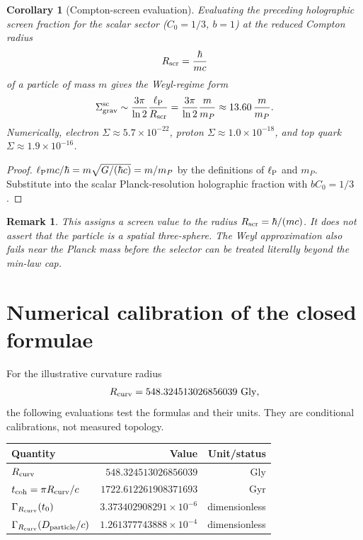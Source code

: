 \documentclass[11pt,a4paper]{article}
\newtheorem{corollary}[theorem]{Corollary}
\newtheorem{remark}[theorem]{Remark}
\newcommand{\ellP}{\ell_{\rm P}}
\begin{document}
\begin{corollary}[Compton-screen evaluation]
\label{cor:compton-screen}
Evaluating the preceding holographic screen fraction for the scalar sector ($C_0=1/3$, $b=1$) at the reduced Compton radius
\[
R_{\rm scr}=\frac{\hbar}{mc}
\]
of a particle of mass $m$ gives the Weyl-regime form
\[
\Sigma_{\rm grav}^{\rm sc}
\sim
\frac{3\pi}{\ln2}\frac{\ellP}{R_{\rm scr}}
=
\frac{3\pi}{\ln2}\frac{m}{m_P}
\approx 13.60\,\frac{m}{m_P}.
\]
Numerically, electron $\Sigma\approx5.7\times10^{-22}$, proton $\Sigma\approx1.0\times10^{-18}$, and top quark $\Sigma\approx1.9\times10^{-16}$.
\end{corollary}
\begin{proof}
$\ellP mc/\hbar=m\sqrt{G/(\hbar c)}=m/m_P$ by the definitions of $\ellP$ and $m_P$.  Substitute into the scalar Planck-resolution holographic fraction with $bC_0=1/3$.
\end{proof}
\begin{remark}
This assigns a screen value to the radius $R_{\rm scr}=\hbar/(mc)$.  It does not assert that the particle is a spatial three-sphere.  The Weyl approximation also fails near the Planck mass before the selector can be treated literally beyond the min-law cap.
\end{remark}

\section{Numerical calibration of the closed formulae}

For the illustrative curvature radius
\[
R_{\rm curv}=548.324513026856039\ {\rm Gly},
\]
the following evaluations test the formulas and their units.  They are conditional calibrations, not measured topology.

\begin{center}
\small
\begin{tabular}{lrr}
\toprule
Quantity & Value & Unit/status\\
\midrule
$R_{\rm curv}$ & $548.324513026856039$ & Gly\\
$t_{\rm coh}=\pi R_{\rm curv}/c$ & $1722.612261908371693$ & Gyr\\
$\Gamma_{R_{\rm curv}}(t_0)$ & $3.373402908291\times10^{-6}$ & dimensionless\\
$\Gamma_{R_{\rm curv}}(D_{\rm particle}/c)$ & $1.261377743888\times10^{-4}$ & dimensionless\\
\bottomrule
\end{tabular}
\end{center}
\end{document}
